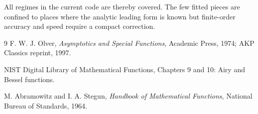 \documentclass[11pt,a4paper]{article}
\begin{document}
All regimes in the current code are thereby covered.  The few fitted pieces are confined to places where the analytic leading form is known but finite-order accuracy and speed require a compact correction.

\begin{thebibliography}{9}
F. W. J. Olver, \emph{Asymptotics and Special Functions}, Academic Press, 1974; AKP Classics reprint, 1997.

NIST Digital Library of Mathematical Functions, Chapters 9 and 10: Airy and Bessel functions.

M. Abramowitz and I. A. Stegun, \emph{Handbook of Mathematical Functions}, National Bureau of Standards, 1964.
\end{thebibliography}
\end{document}
